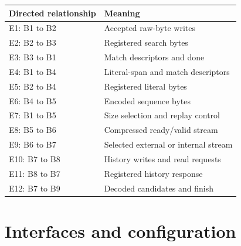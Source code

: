 \documentclass[11pt,a4paper]{article}
\begin{document}
{\small\renewcommand{\arraystretch}{1.18}\begin{longtable}{@{}L{0.24\textwidth}|L{0.7\textwidth}@{}}\toprule

\textbf{Directed relationship} & \textbf{Meaning}\\\midrule\endhead

E1: B1 to B2 & Accepted raw-byte writes\\[2pt]\hline

E2: B2 to B3 & Registered search bytes\\[2pt]\hline

E3: B3 to B1 & Match descriptors and done\\[2pt]\hline

E4: B1 to B4 & Literal-span and match descriptors\\[2pt]\hline

E5: B2 to B4 & Registered literal bytes\\[2pt]\hline

E6: B4 to B5 & Encoded sequence bytes\\[2pt]\hline

E7: B1 to B5 & Size selection and replay control\\[2pt]\hline

E8: B5 to B6 & Compressed ready/\allowbreak{}valid stream\\[2pt]\hline

E9: B6 to B7 & Selected external or internal stream\\[2pt]\hline

E10: B7 to B8 & History writes and read requests\\[2pt]\hline

E11: B8 to B7 & Registered history response\\[2pt]\hline

E12: B7 to B9 & Decoded candidates and finish\\[2pt]\hline

\bottomrule\end{longtable}}

\section{Interfaces and configuration}
\end{document}

